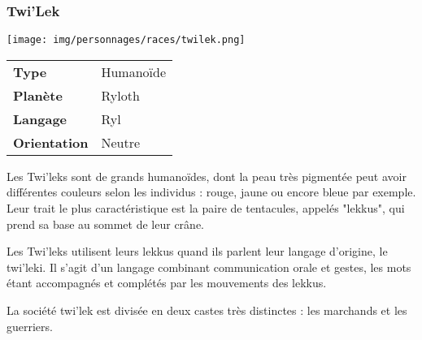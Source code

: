\subsubsection{Twi’Lek}
\begin{samepage}
	\vspace{-1\baselineskip}
	\texttt{[image: img/personnages/races/twilek.png]}
	\vspace{-5\baselineskip}
	\begin{flushright}
		\begin{tabular}{ l l }
			\textbf{Type} 			& Humanoïde \\
		   	\textbf{Planète} 		& Ryloth \\
		   	\textbf{Langage} 		& Ryl \\
		   	\textbf{Orientation} 	& Neutre \\
		\end{tabular}
	\end{flushright}
\end{samepage}

Les Twi’leks sont de grands humanoïdes, dont la peau très pigmentée peut avoir différentes couleurs selon les individus : rouge, jaune ou encore bleue par exemple. Leur trait le plus caractéristique est la paire de tentacules, appelés "lekkus", qui prend sa base au sommet de leur crâne.

Les Twi’leks utilisent leurs lekkus quand ils parlent leur langage d’origine, le twi’leki. Il s’agit d’un langage combinant communication orale et gestes, les mots étant accompagnés et complétés par les mouvements des lekkus.

La société twi’lek est divisée en deux castes très distinctes : les marchands et les guerriers.

